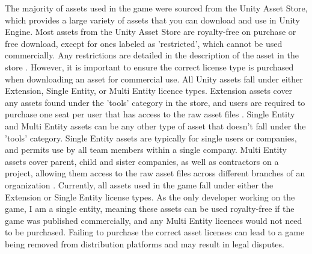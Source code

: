 \documentclass[10pt]{final_report}
\begin{document}
The majority of assets used in the game were sourced from the Unity Asset Store, which provides a large variety of assets that you can download and use in Unity Engine. Most assets from the Unity Asset Store are royalty-free on purchase or free download, except for ones labeled as 'restricted', which cannot be used commercially. Any restrictions are detailed in the description of the asset in the store \cite{UnityCommercial}. However, it is important to ensure the correct license type is purchased when downloading an asset for commercial use.
All Unity assets fall under either Extension, Single Entity, or Multi Entity licence types. Extension assets cover any assets found under the 'tools' category in the store, and users are required to purchase one seat per user that has access to the raw asset files \cite{UnityLicences}. Single Entity and Multi Entity assets can be any other type of asset that doesn't fall under the 'tools' category. Single Entity assets are typically for single users or companies, and permits use by all team members within a single company. Multi Entity assets cover parent, child and sister companies, as well as contractors on a project, allowing them access to the raw asset files across different branches of an organization \cite{UnityLicences}. Currently, all assets used in the game fall under either the Extension or Single Entity license types. As the only developer working on the game, I am a single entity, meaning these assets can be used royalty-free if the game was published commercially, and any Multi Entity licences would not need to be purchased. Failing to purchase the correct asset licenses can lead to a game being removed from distribution platforms and may result in legal disputes.
\end{document}
